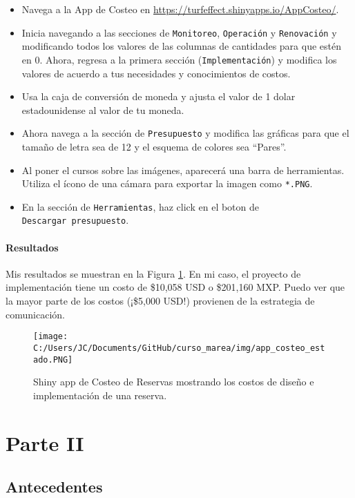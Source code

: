 \documentclass[]{krantz}
\begin{document}
\begin{itemize}
\item
  Navega a la App de Costeo en
  \url{https://turfeffect.shinyapps.io/AppCosteo/}.
\item
  Inicia navegando a las secciones de \texttt{Monitoreo},
  \texttt{Operación} y \texttt{Renovación} y modificando todos los
  valores de las columnas de cantidades para que estén en 0. Ahora,
  regresa a la primera sección (\texttt{Implementación}) y modifica los
  valores de acuerdo a tus necesidades y conocimientos de costos.
\item
  Usa la caja de conversión de moneda y ajusta el valor de 1 dolar
  estadounidense al valor de tu moneda.
\item
  Ahora navega a la sección de \texttt{Presupuesto} y modifica las
  gráficas para que el tamaño de letra sea de 12 y el esquema de colores
  sea ``Pares''.
\item
  Al poner el cursos sobre las imágenes, aparecerá una barra de
  herramientas. Utiliza el ícono de una cámara para exportar la imagen
  como \texttt{*.PNG}.
\item
  En la sección de \texttt{Herramientas}, haz click en el boton de
  \texttt{Descargar\ presupuesto}.
\end{itemize}

\hypertarget{resultados}{%
\subsection{Resultados}\label{resultados}}

Mis resultados se muestran en la Figura \ref{fig:resultados-costeo}. En
mi caso, el proyecto de implementación tiene un costo de \$10,058 USD o
\$201,160 MXP. Puedo ver que la mayor parte de los costos (¡\$5,000
USD!) provienen de la estrategia de comunicación.

\begin{figure}
\centering
\texttt{[image: C:/Users/JC/Documents/GitHub/curso\_marea/img/app\_costeo\_estado.PNG]}
\caption{\label{fig:resultados-costeo}Shiny app de Costeo de Reservas
mostrando los costos de diseño e implementación de una reserva.}
\end{figure}

\hypertarget{part-parte-ii}{%
\part{Parte II}\label{part-parte-ii}}

\hypertarget{antecedentes}{%
\chapter{Antecedentes}\label{antecedentes}}
\end{document}
